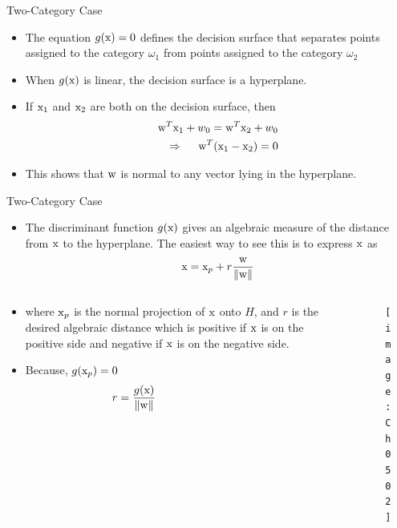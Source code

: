 \begin{frame}{Two-Category Case}
\begin{itemize}
\item The equation $g({\rm x}) = 0$ defines the decision surface that separates points assigned to the category ${\omega_1}$ from points assigned to the category ${\omega}_2$
\item When $g({\rm x})$ is linear, the decision surface is a hyperplane.
\item If ${\rm x}_1$ and ${\rm x}_2$ are both on the decision
surface, then
\begin{align}
{\rm w}^T{\rm x}_1+w_0={\rm w}^T{\rm x}_2+w_0 \nonumber\\
\Rightarrow ~~~~{\rm w}^T({\rm x}_1-{\rm x}_2)=0\nonumber
\end{align}
\item This shows that ${\rm w}$ is normal to any vector lying in the hyperplane.
\end{itemize}
\end{frame}

\begin{frame}{Two-Category Case}
\begin{itemize}
\item The discriminant function $g({\rm x})$ gives an algebraic measure of the distance from $\rm x$ to the hyperplane. The easiest way to see this is to express ${\rm x}$ as
\begin{equation}
{\rm x} = {{\rm x}_p} + r\frac{{\rm w}}{{\left\| {\rm w} \right\|}} \nonumber
\end{equation}
\end{itemize}
\begin{columns}
\begin{column}{6.5cm}
\begin{itemize}
\item where ${\rm x}_p$ is the normal projection of ${\rm x}$ onto $H$, and $r$ is the desired algebraic distance which is positive if ${\rm x}$ is on the positive side and negative if ${\rm x}$ is on the negative side.
\item Because, $g({\rm x}_p)=0$
\begin{equation}
r = \frac{{g({\rm x})}}{{\left\| {\rm w} \right\|}}~~~~~~~~~~~~~~~~~~~~~~~~~ \nonumber
\end{equation}
\end{itemize}
\end{column}
\begin{column}{4cm}
\vspace{-1cm}
\begin{figure}
\texttt{[image: Ch0502]}
\end{figure}
\end{column}
\end{columns}
\end{frame}

